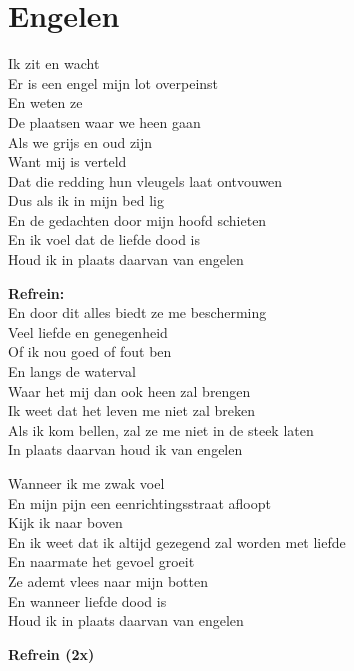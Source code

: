 \section{Engelen}
Ik zit en wacht \\
Er is een engel mijn lot overpeinst\\
En weten ze \\
De plaatsen waar we heen gaan \\
Als we grijs en oud zijn \\
Want mij is verteld \\
Dat die redding hun vleugels laat ontvouwen \\
Dus als ik in mijn bed lig \\
En de gedachten door mijn hoofd schieten \\
En ik voel dat de liefde dood is \\
Houd ik in plaats daarvan van engelen

\textbf{Refrein:}\\
En door dit alles biedt ze me bescherming \\
Veel liefde en genegenheid \\
Of ik nou goed of fout ben \\
En langs de waterval \\
Waar het mij dan ook heen zal brengen \\
Ik weet dat het leven me niet zal breken \\
Als ik kom bellen, zal ze me niet in de steek laten \\
In plaats daarvan houd ik van engelen

Wanneer ik me zwak voel \\
En mijn pijn een eenrichtingsstraat afloopt \\
Kijk ik naar boven \\
En ik weet dat ik altijd gezegend zal worden met liefde \\
En naarmate het gevoel groeit \\
Ze ademt vlees naar mijn botten \\
En wanneer liefde dood is \\
Houd ik in plaats daarvan van engelen

\textbf{Refrein (2x)}
